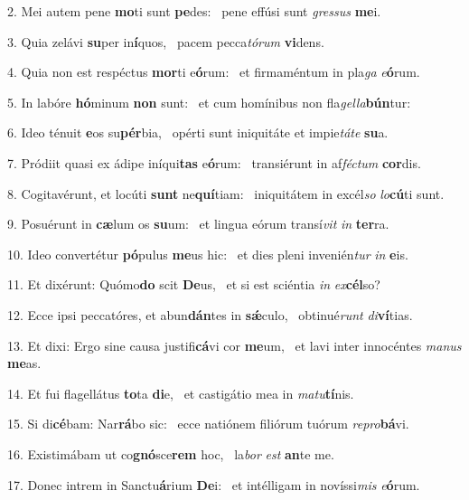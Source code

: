 2. Mei autem pene \textbf{mo}ti sunt \textbf{pe}des: \ast\  pene effúsi sunt \textit{gres}\textit{sus} \textbf{me}i.\

3. Quia zelávi \textbf{su}per in\textbf{í}quos, \ast\  pacem pecca\textit{tó}\textit{rum} \textbf{vi}dens.\

4. Quia non est respéctus \textbf{mor}ti e\textbf{ó}rum: \ast\  et firmaméntum in pla\textit{ga} \textit{e}\textbf{ó}rum.\

5. In labóre \textbf{hó}minum \textbf{non} sunt: \ast\  et cum homínibus non fla\textit{gel}\textit{la}\textbf{bún}tur:\

6. Ideo ténuit \textbf{e}os su\textbf{pér}bia, \ast\  opérti sunt iniquitáte et impie\textit{tá}\textit{te} \textbf{su}a.\

7. Pródiit quasi ex ádipe iníqui\textbf{tas} e\textbf{ó}rum: \ast\  transiérunt in af\textit{féc}\textit{tum} \textbf{cor}dis.\

8. Cogitavérunt, et locúti \textbf{sunt} ne\textbf{quí}tiam: \ast\  iniquitátem in excél\textit{so} \textit{lo}\textbf{cú}ti sunt.\

9. Posuérunt in \textbf{cæ}lum os \textbf{su}um: \ast\  et lingua eórum transí\textit{vit} \textit{in} \textbf{ter}ra.\

10. Ideo convertétur \textbf{pó}pulus \textbf{me}us hic: \ast\  et dies pleni invenién\textit{tur} \textit{in} \textbf{e}is.\

11. Et dixérunt: Quómo\textbf{do} scit \textbf{De}us, \ast\  et si est sciéntia \textit{in} \textit{ex}\textbf{cél}so?\

12. Ecce ipsi peccatóres, et abun\textbf{dán}tes in \textbf{sǽ}culo, \ast\  obtinué\textit{runt} \textit{di}\textbf{ví}tias.\

13. Et dixi: Ergo sine causa justifi\textbf{cá}vi cor \textbf{me}um, \ast\  et lavi inter innocéntes \textit{ma}\textit{nus} \textbf{me}as.\

14. Et fui flagellátus \textbf{to}ta \textbf{di}e, \ast\  et castigátio mea in \textit{ma}\textit{tu}\textbf{tí}nis.\

15. Si di\textbf{cé}bam: Nar\textbf{rá}bo sic: \ast\  ecce natiónem filiórum tuórum \textit{re}\textit{pro}\textbf{bá}vi.\

16. Existimábam ut co\textbf{gnó}sce\textbf{rem} hoc, \ast\  la\textit{bor} \textit{est} \textbf{an}te me.\

17. Donec intrem in Sanctu\textbf{á}rium \textbf{De}i: \ast\  et intélligam in novíssi\textit{mis} \textit{e}\textbf{ó}rum.\

